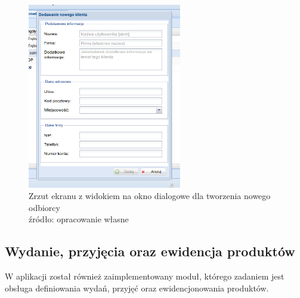 		\begin{figure}[H]
			\centering
			\includegraphics[width=0.6\textwidth]{images/app/new_receipient_dialog}
			\caption[Aplikacja - Dodawania nowego klienta - odbiorcy]{
				Zrzut ekranu z widokiem na okno dialogowe dla tworzenia nowego odbiorcy \\
				źródło: opracowanie własne
			}
			\label{c7:fig:app:new_receipient_dialog}
		\end{figure}	
	
	\pagebreak
	\subsection{Wydanie, przyjęcia oraz ewidencja produktów}
		W aplikacji został również zaimplementowany moduł, którego zadaniem jest
		obsługa definiowania wydań, przyjęć oraz ewidencjonowania produktów.	
	
